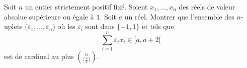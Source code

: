 Soit $n$ un entier strictement positif fixé. Soient $x_1,  \dots, x_n$ des réels de valeur absolue supérieure ou égale à $1$. Soit $a$ un réel. Montrer que l’ensemble des $n$-uplets $(\varepsilon_1, \dots, \varepsilon_n$) où les $\varepsilon_i$ sont dans $\{-1, 1\}$ et tels que
$$\sum\limits_{i=1}^n \varepsilon_i x_i \in [a, a+2[$$
est de cardinal au plus $\binom n{\lceil \frac n2\rceil}$.